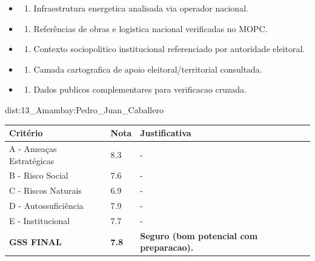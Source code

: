 {\begin{itemize}
\item
  \begin{enumerate}
  \def\labelenumi{\arabic{enumi})}
  \setcounter{enumi}{7}
  \tightlist
  \item
    Infraestrutura energetica analisada via operador nacional.
  \end{enumerate}
\item
  \begin{enumerate}
  \def\labelenumi{\arabic{enumi})}
  \setcounter{enumi}{8}
  \tightlist
  \item
    Referências de obras e logistica nacional verificadas no MOPC.
  \end{enumerate}
\item
  \begin{enumerate}
  \def\labelenumi{\arabic{enumi})}
  \setcounter{enumi}{9}
  \tightlist
  \item
    Contexto sociopolitico institucional referenciado por autoridade
    eleitoral.
  \end{enumerate}
\item
  \begin{enumerate}
  \def\labelenumi{\arabic{enumi})}
  \setcounter{enumi}{10}
  \tightlist
  \item
    Camada cartografica de apoio eleitoral/\allowbreak territorial consultada.
  \end{enumerate}
\item
  \begin{enumerate}
  \def\labelenumi{\arabic{enumi})}
  \setcounter{enumi}{11}
  \tightlist
  \item
    Dados publicos complementares para verificacao cruzada.
  \end{enumerate}
\end{itemize}}{dist:13_Amambay:Pedro_Juan_Caballero}
\begin{table}[ht!]
\small \begin{tabular}{p{3.0cm}p{0.8cm}p{6.0cm}} \toprule
\textbf{Critério} & \textbf{Nota} & \textbf{Justificativa} \\ \midrule
A - Ameaças Estratégicas & 8.3 & - \\
B - Risco Social & 7.6 & - \\
C - Riscos Naturais & 6.9 & - \\
D - Autossuficiência & 7.9 & - \\
E - Institucional & 7.7 & - \\
\midrule \textbf{GSS FINAL} & \textbf{7.8} & \textbf{Seguro (bom potencial com preparacao).} \\ \bottomrule \end{tabular}
\end{table}
